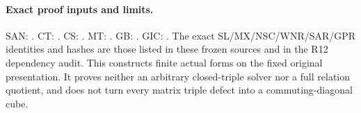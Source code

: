 \paragraph{Exact proof inputs and limits.}
SAN: .
CT: .
CS: .
MT: .
GB: .
GIC: .
The exact SL/MX/NSC/WNR/SAR/GPR identities and hashes are those
listed in these frozen sources and in the R12 dependency audit.
This constructs finite actual forms on the fixed original
presentation.  It proves neither an arbitrary closed-triple solver
nor a full relation quotient, and does not turn every matrix triple
defect into a commuting-diagonal cube.
